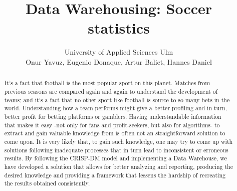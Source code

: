 \documentclass[11pt, journal]{IEEEtran}
\begin{document}
%
\title{Data Warehousing: Soccer statistics 
}
%
%
%

\author{ \parbox{3 in}{\centering  University of Applied Sciences Ulm\\
         {Onur Yavuz, Eugenio Donaque, Artur Baliet, Hannes Daniel}}
}









\maketitle

\begin{abstract}
It's a fact that football is the most popular sport on this planet. Matches from previous seasons are compared again and again to understand the development of teams; and it's a fact that no other sport like football is source to so many bets in the world. Understanding how a team performs might give a better profiling and in turn, better profit for betting platforms or gamblers. Having understandable information that makes it easy -not only for fans and profit-seekers, but also for algorithms- to extract and gain valuable knowledge from is often not an straightforward solution to come upon. It is very likely that, to gain such knowledge, one may try to come up with solutions following inadequate processes that in turn lead to inconsistent or erroneous results. By following the CRISP-DM model and implementing a Data Warehouse, we have developed a solution that allows for better analyzing and reporting, producing the desired knowledge and providing a framework that lessens the hardship of recreating the results obtained consistently. 
\end{abstract}
\end{document}
